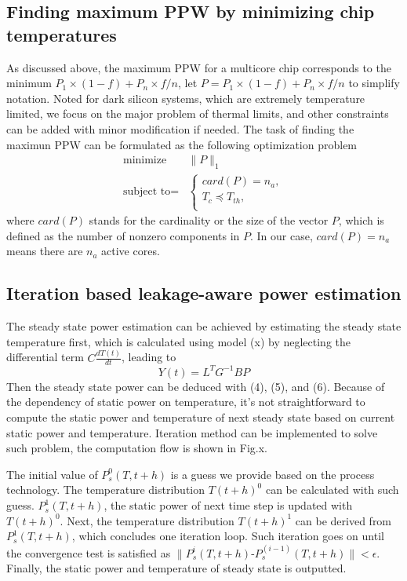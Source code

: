 \subsection{Finding maximum PPW by minimizing chip temperatures}
As discussed above, the maximum PPW for a multicore chip corresponds to the minimum $P_{1} \times (1-f)+P_{n} \times f/n$, let $P = P_{1} \times (1-f)+P_{n} \times f/n$ to simplify notation. Noted for dark silicon systems, which are extremely temperature limited, we focus on the major problem of thermal limits, and other constraints can be added with minor modification if needed. The task of finding the maximun PPW can be formulated as the following optimization problem
\begin{equation}
\begin{split}
\text{minimize } & \|P\|_{1}\\
\text{subject to} = &\left\{
\begin{array}{c}
card(P) = n_{a},\\
T_{c} \preceq T_{th},\\
\end{array}
\right.
\end{split}
\end{equation}
where $card(P)$ stands for the cardinality or the size of the vector $P$, which is defined as the number of nonzero components in $P$. In our case, $card(P) = n_{a}$ means there are $n_{a}$ active cores.



\subsection{Iteration based leakage-aware power estimation}
The steady state power estimation can be achieved by estimating the steady state temperature first, which is calculated using model (x) by neglecting the differential term $C\frac{dT(t)}{dt}$, leading to
\begin{equation}\label{steady_state_temperature}
Y(t) = L^{T}G^{-1}BP
\end{equation}
Then the steady state power can be deduced with (4), (5), and (6).
Because of the dependency of static power on temperature, it's not straightforward to compute the static power and temperature of next steady state based on current static power and temperature. Iteration method can be implemented to solve such problem, the computation flow is shown in Fig.x.

The initial value of $P^0_s(T,t+h)$ is a guess we provide based on the process technology. The temperature distribution $T(t+h)^0$ can be calculated with such guess. $P^1_s(T,t+h)$, the static power of next time step is updated with $T(t+h)^0$. Next, the temperature distribution $T(t+h)^1$ can be derived from $P^1_s(T,t+h)$, which concludes one iteration loop. Such iteration goes on until the convergence test is satisfied as $\parallel P^i_s(T,t+h)$-$P^(i-1)_s(T,t+h)\parallel<\epsilon$. Finally, the static power and temperature of steady state is outputted.

